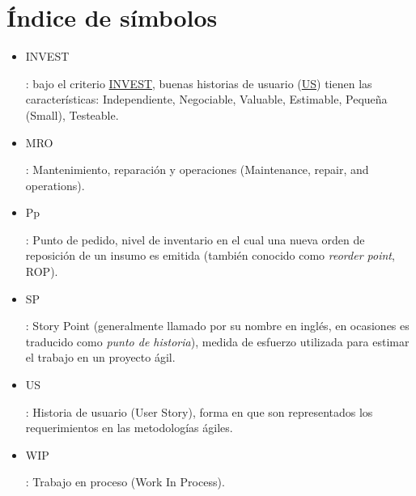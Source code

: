 \documentclass[a4paper, 12pt,twoside]{report}  %
\numberwithin{equation}{subsection} %
\begin{document}
\chapter*{Índice de símbolos}
\begin{itemize}
\item \hypertarget{INVEST}{INVEST}: bajo el criterio \hyperlink{INVEST}{INVEST}, buenas historias de usuario (\hyperlink{US}{US}) tienen las características: Independiente, Negociable, Valuable, Estimable, Pequeña (Small), Testeable.
\item \hypertarget{MRO}{MRO}: Mantenimiento, reparación y operaciones (Maintenance, repair, and operations).
\item \hypertarget{Pp}{Pp}: Punto de pedido, nivel de inventario en el cual una nueva orden de reposición de un insumo es emitida (también conocido como \textit{reorder point}, ROP).
\item \hypertarget{SP}{SP}: Story Point (generalmente llamado por su nombre en inglés, en ocasiones es traducido como \textit{punto de historia}), medida de esfuerzo utilizada para estimar el trabajo en un proyecto ágil.
\item \hypertarget{US}{US}: Historia de usuario (User Story), forma en que son representados los requerimientos en las metodologías ágiles.
\item \hypertarget{WIP}{WIP}: Trabajo en proceso (Work In Process).
\end{itemize}

\renewcommand{\listfigurename}{Índice de figuras}
\listoffigures
{}

\renewcommand{\listtablename}{Índice de tablas}
\listoftables
{}

\clearpage
\end{document}
